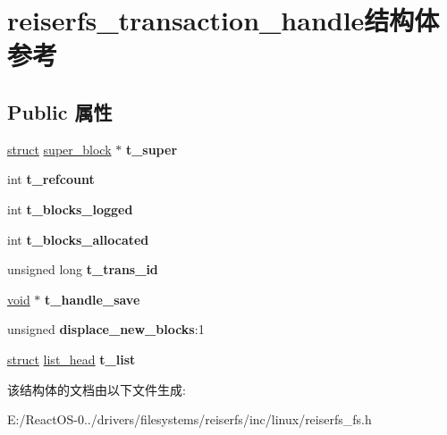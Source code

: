 \hypertarget{structreiserfs__transaction__handle}{}\section{reiserfs\+\_\+transaction\+\_\+handle结构体 参考}
\label{structreiserfs__transaction__handle}
\subsection*{Public 属性}
\begin{DoxyCompactItemize}
\item 
\mbox{\label{structreiserfs__transaction__handle_a4b9b9cd0aea008670abeedf79708421b}} 
\hyperlink{interfacestruct}{struct} \hyperlink{structsuper__block}{super\+\_\+block} $\ast$ {\bfseries t\+\_\+super}
\item 
\mbox{\label{structreiserfs__transaction__handle_a6d189e1c902afa30c1fe331666d98719}} 
int {\bfseries t\+\_\+refcount}
\item 
\mbox{\label{structreiserfs__transaction__handle_a8df56eff59ad35d9c4e446592bf94ba2}} 
int {\bfseries t\+\_\+blocks\+\_\+logged}
\item 
\mbox{\label{structreiserfs__transaction__handle_ade9aa7a44dcce4863915d8dfc8b370f7}} 
int {\bfseries t\+\_\+blocks\+\_\+allocated}
\item 
\mbox{\label{structreiserfs__transaction__handle_a63220a5b011f04a701b9ad9be1b5de04}} 
unsigned long {\bfseries t\+\_\+trans\+\_\+id}
\item 
\mbox{\label{structreiserfs__transaction__handle_a2709deefa1fb6610f4989e3f39f1598d}} 
\hyperlink{interfacevoid}{void} $\ast$ {\bfseries t\+\_\+handle\+\_\+save}
\item 
\mbox{\label{structreiserfs__transaction__handle_a67a088517e184671d8db0f780cb2d3f1}} 
unsigned {\bfseries displace\+\_\+new\+\_\+blocks}\+:1
\item 
\mbox{\label{structreiserfs__transaction__handle_acb400ead9a891beaa8497af5db1ab21d}} 
\hyperlink{interfacestruct}{struct} \hyperlink{structlist__head}{list\+\_\+head} {\bfseries t\+\_\+list}
\end{DoxyCompactItemize}


该结构体的文档由以下文件生成\+:\begin{DoxyCompactItemize}
\item 
E\+:/\+React\+O\+S-\/0../drivers/filesystems/reiserfs/inc/linux/reiserfs\+\_\+fs.\+h\end{DoxyCompactItemize}
